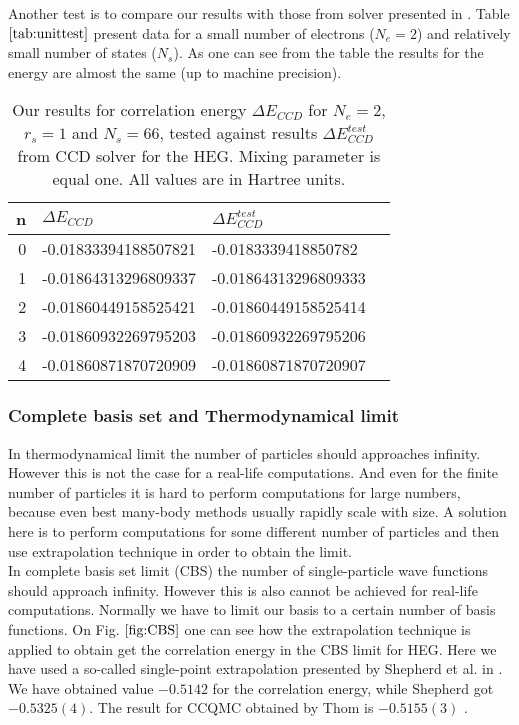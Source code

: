 Another test is to compare our results with those from solver presented in \cite{hjorth-jensenAdvancedCourseComputational2017}. Table $\ref{tab:unittest}$ present data for a small number of electrons ($N_e=2$) and relatively small number of states ($N_s$). As one can see from the table the results for the energy are almost the same (up to machine precision).
\begin{table}[h]
	\centering

	\begin{tabular}{rlll}
		n & $\Delta E_{CCD}$     &   $\Delta E_{CCD}^{test}$  \\ \hline
		0 & -0.01833394188507821 & -0.0183339418850782  \\
		1 & -0.01864313296809337 & -0.01864313296809333 \\
		2 & -0.01860449158525421 & -0.01860449158525414 \\
		3 & -0.01860932269795203 & -0.01860932269795206 \\
		4 & -0.01860871870720909 & -0.01860871870720907 \\
	\end{tabular}
		\captionsetup{width=1\textwidth}
		\caption{Our results for correlation energy $\Delta E_{CCD}$  for $N_e=2$, $r_s=1$ and $N_s=66$,   tested against results  $\Delta E_{CCD}^{test}$ from \cite{hjorth-jensenAdvancedCourseComputational2017} CCD solver for the HEG. Mixing parameter is equal one. All values are in Hartree units.}
	\label{tab:unittest}
\end{table}
\subsubsection{Complete basis set and Thermodynamical limit}
In thermodynamical limit the number of particles should approaches infinity. However this is not the case for a real-life computations. And even for the finite number of particles it is hard to perform computations for large numbers, because even best many-body methods usually rapidly scale with size. A solution here is to perform computations for some different number of particles and then use extrapolation technique in order to obtain the limit.\\
In complete basis set limit (CBS) the number of single-particle wave functions should approach infinity. However this is also cannot be achieved for real-life computations. Normally we have to limit our basis to a certain number of basis functions. On Fig. $\ref{fig:CBS}$ one can see how the extrapolation technique is applied to obtain get the correlation energy in the CBS limit for HEG. Here we have used a so-called single-point extrapolation presented by Shepherd et al. in \cite{shepherdInvestigationFullConfiguration2012}. We have obtained value $-0.5142$ for the correlation energy, while Shepherd got $-0.5325(4)$. The result for CCQMC obtained by Thom is $-0.5155(3)$ \cite{spencerDevelopmentsStochasticCoupled2016}.

